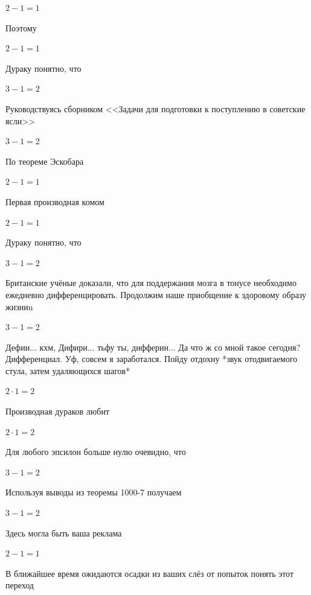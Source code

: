 \documentclass[12pt,a4paper,fleqn]{article}
\begin{document}
\begin{center}$2-1 = 1$\end{center}
Поэтому

\begin{center}$2-1 = 1$\end{center}
Дураку понятно, что

\begin{center}$3-1 = 2$\end{center}
Руководствуясь сборником <<Задачи для подготовки к поступлению в советские ясли>>\cite{link1}

\begin{center}$3-1 = 2$\end{center}
По теореме Эскобара

\begin{center}$2-1 = 1$\end{center}
Первая производная комом\cite{link2}

\begin{center}$2-1 = 1$\end{center}
Дураку понятно, что

\begin{center}$3-1 = 2$\end{center}
Британские учёные доказали, что для поддержания мозга в тонусе необходимо ежедневно дифференцировать. Продолжим наше приобщение к здоровому образу жизниn

\begin{center}$3-1 = 2$\end{center}
Дефии... кхм, Дифири... тьфу ты, дифферин... Да что ж со мной такое сегодня? Дифференциал. Уф, совсем я заработался. Пойду отдохну *звук отодвигаемого стула, затем удаляющихся шагов*

\begin{center}$2 \cdot 1 = 2$\end{center}
Производная дураков любит\cite{link2}

\begin{center}$2 \cdot 1 = 2$\end{center}
Для любого эпсилон больше нулю очевидно, что

\begin{center}$3-1 = 2$\end{center}
Используя выводы из теоремы 1000-7 получаем

\begin{center}$3-1 = 2$\end{center}
Здесь могла быть ваша реклама

\begin{center}$2-1 = 1$\end{center}
В ближайшее время ожидаются осадки из ваших слёз от попыток понять этот переход
\end{document}
